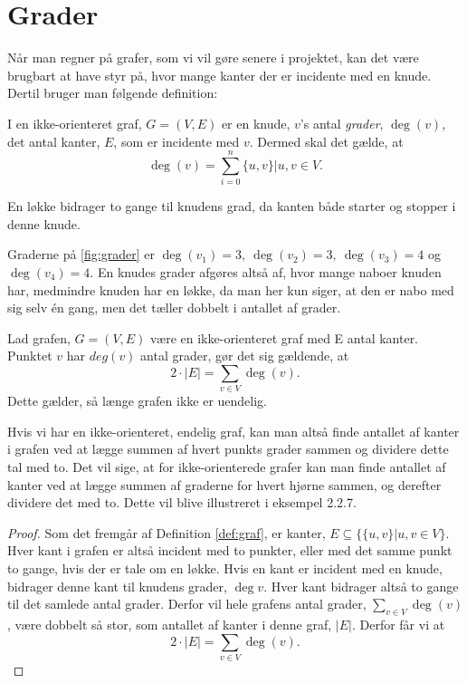 \section{Grader} \label{sec:grader}
Når man regner på grafer, som vi vil gøre senere i projektet, kan det være brugbart at have styr på, hvor mange kanter der er incidente med en knude. Dertil bruger man følgende definition:

\begin{defn}[Grader] \label{defn:grader}
I en ikke-orienteret graf, $G = (V,E)$ er en knude, $v$'s antal \emph{grader}, $\deg(v)$, det antal kanter, $E$, som er incidente med $v$. Dermed skal det gælde, at
\begin{equation}
\deg(v)=\sum_{i=0} ^{n} \{u,v\}|u,v \in V .
\end{equation}
\end{defn}

En løkke bidrager to gange til knudens grad, da kanten både starter og stopper i denne knude.

\begin{exmp} \label{ex:grader}

Graderne på \autoref{fig:grader} er $\deg(v_{1})=3, \ \deg(v_{2})=3, \ \deg(v_{3})=4$ og $\deg(v_{4})=4$. En knudes grader afgøres altså af, hvor mange naboer knuden har, medmindre knuden har en løkke, da man her kun siger, at den er nabo med sig selv én gang, men det tæller dobbelt i antallet af grader.


\end{exmp}

\begin{thm}
Lad grafen, $G = (V,E)$ være en ikke-orienteret graf med E antal kanter. Punktet $v$ har $deg(v)$ antal grader, gør det sig gældende, at
\begin{equation}
2 \cdot |E|= \sum_{v \in V} { } \deg(v).
\end{equation}
Dette gælder, så længe grafen ikke er uendelig.
\end{thm}
Hvis vi har en ikke-orienteret, endelig graf, kan man altså finde antallet af kanter i grafen ved at lægge summen af hvert punkts grader sammen og dividere dette tal med to.
Det vil sige, at for ikke-orienterede grafer kan man finde antallet af kanter ved at lægge summen af graderne for hvert hjørne sammen, og derefter dividere det med to. Dette vil blive illustreret i eksempel 2.2.7.

\begin{proof}
Som det fremgår af Definition \ref{def:graf}, er kanter, $E \subseteq \{\{u,v\}|u,v \in V \}$. Hver kant i grafen er altså incident med to punkter, eller med det samme punkt to gange, hvis der er tale om en løkke. Hvis en kant er incident med en knude, bidrager denne kant til knudens grader, $\deg{v}$. Hver kant bidrager altså to gange til det samlede antal grader. Derfor vil hele grafens antal grader, $\sum_{v \in V} { } \deg(v)$, være dobbelt så stor, som antallet af kanter i denne graf, $|E|$. Derfor får vi at 
\begin{equation}
2 \cdot |E|= \sum_{v \in V} { } \deg(v).
\end{equation} 
\end{proof}